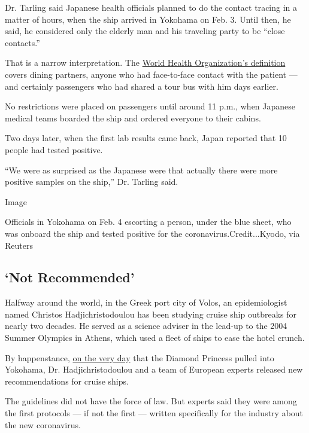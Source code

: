Dr. Tarling said Japanese health officials planned to do the contact
tracing in a matter of hours, when the ship arrived in Yokohama on Feb.
3. Until then, he said, he considered only the elderly man and his
traveling party to be ``close contacts.''

That is a narrow interpretation. The
\href{https://www.who.int/publications-detail/operational-considerations-for-managing-covid-19-cases-outbreak-on-board-ships}{World
Health Organization's definition} covers dining partners, anyone who had
face-to-face contact with the patient --- and certainly passengers who
had shared a tour bus with him days earlier.

No restrictions were placed on passengers until around 11 p.m., when
Japanese medical teams boarded the ship and ordered everyone to their
cabins.

Two days later, when the first lab results came back, Japan reported
that 10 people had tested positive.

``We were as surprised as the Japanese were that actually there were
more positive samples on the ship,'' Dr. Tarling said.

Image

Officials in Yokohama on Feb. 4 escorting a person, under the blue
sheet, who was onboard the ship and tested positive for the
coronavirus.Credit...Kyodo, via Reuters

\hypertarget{not-recommended}{%
\subsection{`Not Recommended'}\label{not-recommended}}

Halfway around the world, in the Greek port city of Volos, an
epidemiologist named Christos Hadjichristodoulou has been studying
cruise ship outbreaks for nearly two decades. He served as a science
adviser in the lead-up to the 2004 Summer Olympics in Athens, which used
a fleet of ships to ease the hotel crunch.

By happenstance,
\href{https://www.gac.com/491364/siteassets/about-gac/coronavirus/eu-interim-advice_2019-ncov_maritime_4_2_2020_f.pdf}{on
the very day} that the Diamond Princess pulled into Yokohama, Dr.
Hadjichristodoulou and a team of European experts released new
recommendations for cruise ships.

The guidelines did not have the force of law. But experts said they were
among the first protocols --- if not the first --- written specifically
for the industry about the new coronavirus.

